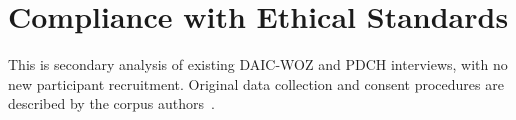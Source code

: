 \documentclass{article}
\begin{document}
\section{Compliance with Ethical Standards}
This is secondary analysis of existing DAIC-WOZ and PDCH interviews, with no new participant recruitment. Original data collection and consent procedures are described by the corpus authors~\cite{gratch2014daic,cao2025pdch}.



\end{document}
